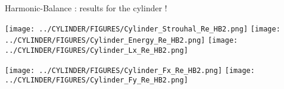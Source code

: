 \documentclass{beamer}
\newcommand{\be}[1]{ \begin{equation} \label{#1}}
\newcommand{\ee}{\end{equation}}
\newcommand{\bes}[1]{ \begin{equation} \label{#1}\begin{array}{rl}}
\newcommand{\ees}{\end{array}\end{equation}}
\begin{document}
\begin{frame}{Harmonic-Balance : results for the cylinder ! }

\begin{center}
\texttt{[image: ../CYLINDER/FIGURES/Cylinder\_Strouhal\_Re\_HB2.png]}
\texttt{[image: ../CYLINDER/FIGURES/Cylinder\_Energy\_Re\_HB2.png]}
\texttt{[image: ../CYLINDER/FIGURES/Cylinder\_Lx\_Re\_HB2.png]}
\end{center}
\begin{center}
\texttt{[image: ../CYLINDER/FIGURES/Cylinder\_Fx\_Re\_HB2.png]}
\texttt{[image: ../CYLINDER/FIGURES/Cylinder\_Fy\_Re\_HB2.png]}
\end{center}

\end{frame}

%
%
%
%
%
%
%
%
%
%
%
%
%
%
%
%
\end{document}
